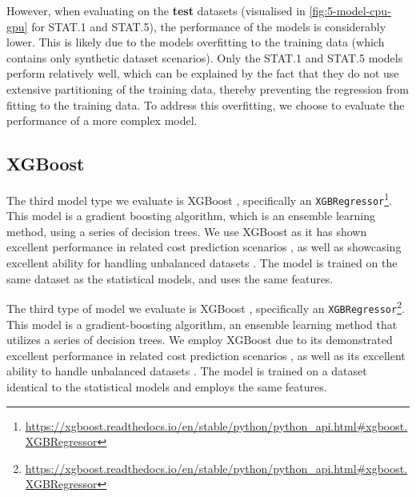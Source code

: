 However, when evaluating on the \textbf{test} datasets (visualised in \autoref{fig:5-model-cpu-gpu} for STAT.1 and STAT.5), the performance of the models is considerably lower. This is likely due to the models overfitting to the training data (which contains only synthetic dataset scenarios). Only the STAT.1 and STAT.5 models perform relatively well, which can be explained by the fact that they do not use extensive partitioning of the training data, thereby preventing the regression from fitting to the training data. To address this overfitting, we choose to evaluate the performance of a more complex model.


\subsection{XGBoost}
\label{subsec:5-xgboost}
The third model type we evaluate is XGBoost \cite{xgboost}, specifically an \texttt{XGBRegressor}\footnote{\url{https://xgboost.readthedocs.io/en/stable/python/python_api.html\#xgboost.XGBRegressor}}. This model is a gradient boosting algorithm, which is an ensemble learning method, using a series of decision trees. We use XGBoost as it has shown excellent performance in related cost prediction scenarios \cite{tvm}, as well as showcasing excellent ability for handling unbalanced datasets \cite{xgboost_imbalanced_data}. The model is trained on the same dataset as the statistical models, and uses the same features.

The third type of model we evaluate is XGBoost \cite{xgboost}, specifically an \texttt{XGBRegressor}\footnote{\url{https://xgboost.readthedocs.io/en/stable/python/python_api.html\#xgboost.XGBRegressor}}. This model is a gradient-boosting algorithm, an ensemble learning method that utilizes a series of decision trees. We employ XGBoost due to its demonstrated excellent performance in related cost prediction scenarios \cite{tvm}, as well as its excellent ability to handle unbalanced datasets \cite{xgboost_imbalanced_data}. The model is trained on a dataset identical to the statistical models and employs the same features.


